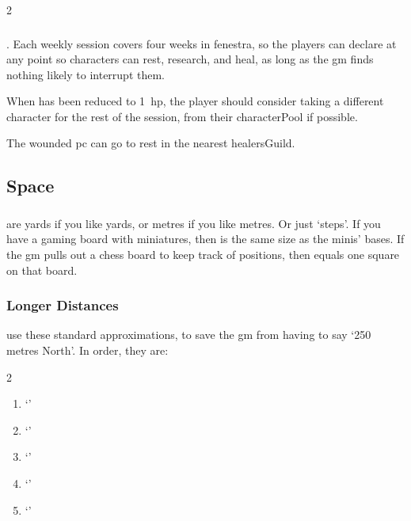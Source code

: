 \begin{multicols}{2}
\subsubsection{}
.
Each weekly session covers four weeks in \gls{fenestra}, so the players can declare  at any point so characters can rest, research, and heal, as long as the \gls{gm} finds nothing likely to interrupt them.

\label{healing}
When  has been reduced to 1~\gls{hp}, the player should consider taking a different character for the rest of the session, from their \gls{characterPool} if possible.

The wounded \gls{pc} can go to rest in the nearest \gls{healersGuild}.

\subsection{Space}
\label{space}

\subsubsection{}
are yards if you like yards, or metres if you like metres.
Or just `\glspl{step}'.
If you have a gaming board with miniatures, then  is the same size as the minis' bases.
If the \gls{gm} pulls out a chess board to keep track of positions, then  equals one square on that board.

\subsubsection{Longer Distances}
use these standard approximations, to save the \gls{gm} from having to say `250 metres North'.
In order, they are:

\begin{multicols}{2}
  \begin{enumerate}
    \item
    \toggletrue{Distant}
    \setcounter{spellCost}{2}
    \setRange{}
    `\spellRange'
    \item
    \setRange{}
    `\spellRange'
    \item
    \setRange{}
    `\spellRange'
    \item
    \setRange{}
    `\spellRange'
    \item
    \setRange{}
    `\spellRange'
  \end{enumerate}
\end{multicols}


\end{multicols}
